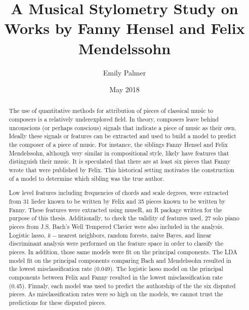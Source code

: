 \documentclass[12pt,twoside]{reedthesis}
\title{A Musical Stylometry Study on Works by Fanny Hensel and Felix
Mendelssohn}
\author{Emily Palmer}
\date{May 2018}
\theoremstyle{definition}
\theoremstyle{definition}
\theoremstyle{definition}
\theoremstyle{remark}
\begin{document}
  \maketitle

\frontmatter %
\pagestyle{empty} %



  \hypersetup{linkcolor=black}
  \setcounter{tocdepth}{2}
  \tableofcontents

  \listoftables

  \listoffigures
  \begin{abstract}
    The use of quantitative methods for attribution of pieces of classical
    music to composers is a relatively underexplored field. In theory,
    composers leave behind unconscious (or perhaps conscious) signals that
    indicate a piece of music as their own. Ideally these signals or
    features can be extracted and used to build a model to predict the
    composer of a piece of music. For instance, the siblings Fanny Hensel
    and Felix Mendelssohn, although very similar in compositional style,
    likely have features that distinguish their music. It is speculated that
    there are at least six pieces that Fanny wrote that were published by
    Felix. This historical setting motivates the construction of a model to
    determine which sibling was the true author.
    
    Low level features including frequencies of chords and scale degrees,
    were extracted from 31 lieder known to be written by Felix and 35 pieces
    known to be written by Fanny. These features were extracted using museR,
    an R package written for the purpose of this thesis. Additionally, to
    check the validity of features used, 27 solo piano pieces from J.S.
    Bach's Well Tempered Clavier were also included in the analysis.
    Logistic lasso, \(k-\)nearest neighbors, random forests, naive Bayes,
    and linear discriminant analysis were performed on the feature space in
    order to classify the pieces. In addition, those same models were fit on
    the principal components. The LDA model fit on the principal components
    comparing Bach and Mendelssohn resulted in the lowest misclassification
    rate (0.049). The logistic lasso model on the principal components
    between Felix and Fanny resulted in the lowest misclassification rate
    (0.45). Finnaly, each model was used to predict the authorship of the
    the six disputed pieces. As misclassification rates were so high on the
    models, we cannot trust the predictions for these disputed pieces.
  \end{abstract}
\end{document}
